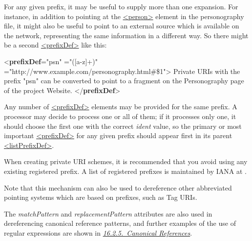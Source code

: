For any given prefix, it may be useful to supply more than one expansion. For instance, in addition to pointing at the \hyperref[TEI.person]{<person>} element in the personography file, it might also be useful to point to an external source which is available on the network, representing the same information in a different way. So there might be a second \hyperref[TEI.prefixDef]{<prefixDef>} like this: \par\bgroup{}\exampleFont \begin{shaded}\noindent\mbox{}{<\textbf{prefixDef}\hspace*{1em}{ident}="{psn}"\mbox{}\newline 
\hspace*{1em}{matchPattern}="{([a-z]+)}"\mbox{}\newline 
\hspace*{1em}{replacementPattern}="{http://www.example.com/personography.html\#\$1}">}\mbox{}\newline 
{} Private URIs with the prefix "psn" can be converted to point\mbox{}\newline 
\hspace*{1em}\hspace*{1em} to a fragment on the Personography page of the project Website.\mbox{}\newline 
{}\mbox{}\newline 
{</\textbf{prefixDef}>}\end{shaded}\egroup\par \noindent  Any number of \hyperref[TEI.prefixDef]{<prefixDef>} elements may be provided for the same prefix. A processor may decide to process one or all of them; if it processes only one, it should choose the first one with the correct {\itshape ident} value, so the primary or most important \hyperref[TEI.prefixDef]{<prefixDef>} for any given prefix should appear first in its parent \hyperref[TEI.listPrefixDef]{<listPrefixDef>}.\par
When creating private URI schemes, it is recommended that you avoid using any existing registered prefix. A list of registered prefixes is maintained by IANA at .\par
Note that this mechanism can also be used to dereference other abbreviated pointing systems which are based on prefixes, such as Tag URIs.\par
The {\itshape matchPattern} and {\itshape replacementPattern} attributes are also used in dereferencing canonical reference patterns, and further examples of the use of regular expressions are shown in \textit{\hyperref[SACR]{16.2.5.\ Canonical References}}.
